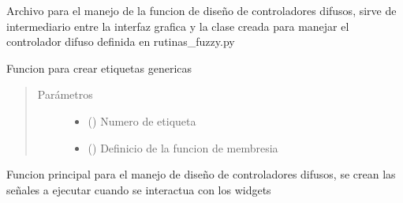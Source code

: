 \documentclass[letterpaper,10pt,spanish]{sphinxmanual}
\begin{document}
\label{\detokenize{codigos/FuzzyHandler:module-FuzzyHandler}}
Archivo para el manejo de la funcion de diseño de controladores difusos, sirve de intermediario entre la interfaz grafica y la clase creada para manejar el controlador difuso definida en rutinas\_fuzzy.py

\begin{fulllineitems}
\label{\detokenize{codigos/FuzzyHandler:FuzzyHandler.EtiquetasDic_creator}}
Funcion para crear etiquetas genericas
\begin{quote}\begin{description}
\item[{Parámetros}] \leavevmode\begin{itemize}
\item {} 
 () \textendash{} Numero de etiqueta

\item {} 
 () \textendash{} Definicio de la funcion de membresia

\end{itemize}

\end{description}\end{quote}

\end{fulllineitems}


\begin{fulllineitems}
\label{\detokenize{codigos/FuzzyHandler:FuzzyHandler.FuzzyHandler}}
Funcion principal para el manejo de diseño de controladores difusos, se crean las señales a ejecutar cuando se interactua con los widgets

\end{fulllineitems}
\end{document}
